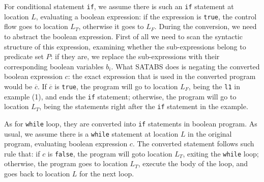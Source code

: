 For conditional statement \lstinline|if|, we assume there is such an \lstinline|if| statement at location $L$, evaluating a boolean expression: if the expression is \lstinline|true|, the control flow goes to location $L_{T}$, otherwise it goes to $L_{F}$.
During the conversion, we need to abstract the boolean expression. First of all we need to scan the syntactic structure of this expression, examining whether the sub-expressions belong to predicate set $P$:
if they are, we replace the sub-expressions with their corresponding boolean variables $b_{i}$.
What SATABS does is negating the converted boolean expression $c$: the exact expression that is used in the converted program would be $\overline{c}$. If $\overline{c}$ is \lstinline|true|, the program will go to location $L_{F}$, being the \lstinline|l1| in example (1), and ends the \lstinline|if| statement; otherwise, the program will go to location $L_{T}$, being the statements right after the \lstinline|if| statement in the example.

As for \lstinline|while| loop, they are converted into \lstinline|if| statements in boolean program.
As usual, we assume there is a \lstinline|while| statement at location $L$ in the original program, evaluating boolean expression $c$. The converted statement follows such rule that: if $c$ is \lstinline|false|, the program will goto location $L_{T}$, exiting the \lstinline|while| loop; otherwise, the program goes to location $L_{T}$, execute the body of the loop, and goes back to location $L$ for the next loop.


